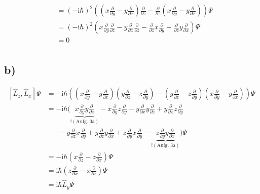 \begin{align*}
        &= \left( -\text{i}\hbar \right)^2 \left( \left( x\frac{\partial}{\partial y} - y\frac{\partial}{\partial x} \right) \frac{\partial}{\partial z} - \frac{\partial}{\partial z} \left( x\frac{\partial}{\partial y} - y\frac{\partial}{\partial x} \right) \right)\Psi\\
        &= \left( -\text{i}\hbar \right)^2 \left( x\frac{\partial}{\partial y} \frac{\partial}{\partial z} - y\frac{\partial}{\partial x} \frac{\partial}{\partial z} - \frac{\partial}{\partial z}x\frac{\partial}{\partial y} + \frac{\partial}{\partial z}y\frac{\partial}{\partial x} \right)\Psi\\
        &= 0\\
    \end{align*}

    \subsection{b)} 

    \begin{align*}
        \left[ \hat{L}_z,\hat{L}_x \right]\Psi &= -\text{i}\hbar \left(\left( x\frac{\partial}{\partial y} - y\frac{\partial}{\partial x} \right) \left( y\frac{\partial}{\partial z} - z\frac{\partial}{\partial y} \right) - \left( y\frac{\partial}{\partial z} - z\frac{\partial}{\partial y} \right) \left( x\frac{\partial}{\partial y} - y\frac{\partial}{\partial x} \right)\right)\Psi\\
        &= -\text{i}\hbar \bigg( \underbrace{x \frac{\partial}{\partial y}y \frac{\partial}{\partial z}}_{! (\text{Aufg. 3a})} - x\frac{\partial}{\partial y} z\frac{\partial}{\partial y} - y\frac{\partial}{\partial x} y\frac{\partial}{\partial z} + y\frac{\partial}{\partial x} z\frac{\partial}{\partial y}\\
        &\phantom{=}\;- y\frac{\partial}{\partial z} x\frac{\partial}{\partial y} + y\frac{\partial}{\partial z} y\frac{\partial}{\partial x} + z\frac{\partial}{\partial y} x\frac{\partial}{\partial y} - \underbrace{ z\frac{\partial}{\partial y}y \frac{\partial}{\partial x}}_{! (\text{Aufg. 3a})}\bigg) \Psi\\
        &= -\text{i} \hbar\left(x\frac{\partial}{\partial z}-z\frac{\partial}{\partial x}\right)\Psi\\
        &= \text{i} \hbar \left(z\frac{\partial}{\partial x}-x\frac{\partial}{\partial z}\right)\Psi\\
        &= \text{i}\hbar \hat{L}_y \Psi
    \end{align*}

